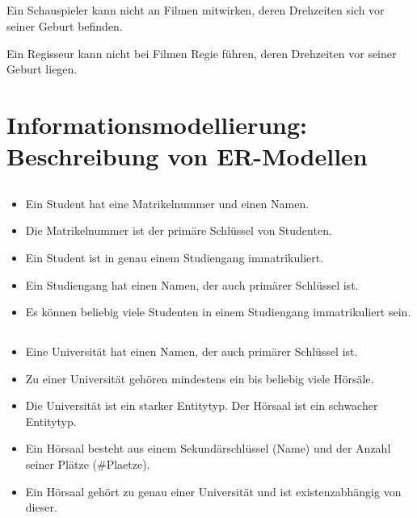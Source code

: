 \documentclass[ngerman]{gdb-aufgabenblatt}
\begin{document}
	\subsection{} %
	Ein Schauspieler kann nicht an Filmen mitwirken, deren Drehzeiten sich vor seiner Geburt befinden.
	
	Ein Regisseur kann nicht bei Filmen Regie führen, deren Drehzeiten vor seiner Geburt liegen.
\section{Informationsmodellierung: Beschreibung von ER-Modellen}
	\subsection{} %
		\begin{itemize}
			\item	Ein Student hat eine Matrikelnummer und einen Namen.
			\item	Die Matrikelnummer ist der primäre Schlüssel von Studenten.
			\item	Ein Student ist in genau einem Studiengang immatrikuliert.
			\item	Ein Studiengang hat einen Namen, der auch primärer Schlüssel ist.
			\item	Es können beliebig viele Studenten in einem Studiengang immatrikuliert sein.
		\end{itemize}
	\subsection{} %
		\begin{itemize}
			\item	Eine Universität hat einen Namen, der auch primärer Schlüssel ist.
			\item	Zu einer Universität gehören mindestens ein bis beliebig viele Hörsäle.
			\item	Die Universität ist ein starker Entitytyp. Der Hörsaal ist ein schwacher Entitytyp.
			\item	Ein Hörsaal besteht aus einem Sekundärschlüssel (Name) und der Anzahl seiner Plätze (\#Plaetze).
			\item	Ein Hörsaal gehört zu genau einer Universität und ist existenzabhängig von dieser.
		\end{itemize}
\end{document}
